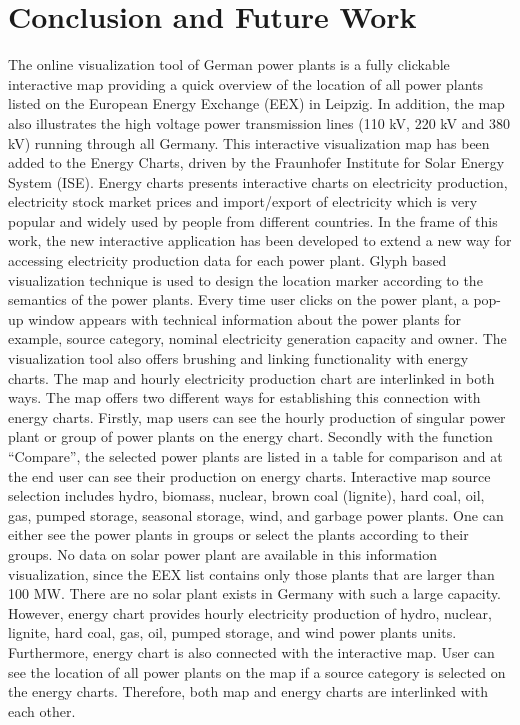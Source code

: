 \chapter{Conclusion and Future Work}
\label{chap:conclusion}

The online visualization tool of German power plants is a fully clickable interactive map providing a quick overview of the location of all power plants listed on the European Energy Exchange (EEX) in Leipzig. In addition, the map also illustrates the high voltage power transmission lines (110 kV, 220 kV and 380 kV) running through all Germany. This interactive visualization map has been added to the Energy Charts, driven by the Fraunhofer Institute for Solar Energy System (ISE). Energy charts presents interactive charts on electricity production, electricity stock market prices and import/export of electricity which is very popular and widely used by people from different countries. In the frame of this work, the new interactive application has been developed to extend a new way for accessing electricity production data for each power plant. Glyph based visualization technique is used to design the location marker according to the semantics of the power plants. Every time user clicks on the power plant, a pop-up window appears with technical information about the power plants for example, source category, nominal electricity generation capacity and owner. The visualization tool also offers brushing and linking functionality with energy charts. The map and hourly electricity production chart are interlinked in both ways. The map offers two different ways for establishing this connection with energy charts. Firstly, map users can see the hourly production of singular power plant or group of power plants on the energy chart. Secondly with the function “Compare”, the selected power plants are listed in a table for comparison and at the end user can see their production on energy charts. Interactive map source selection includes hydro, biomass, nuclear, brown coal (lignite), hard coal, oil, gas, pumped storage, seasonal storage, wind, and garbage power plants. One can either see the power plants in groups or select the plants according to their groups. No data on solar power plant are available in this information visualization, since the EEX list contains only those plants that are larger than 100 MW. There are no solar plant exists in Germany with such a large capacity.  However, energy chart provides hourly electricity production of hydro, nuclear, lignite, hard coal, gas, oil, pumped storage, and wind power plants units. Furthermore, energy chart is also connected with the interactive map. User can see the location of all power plants on the map if a source category is selected on the energy charts. Therefore, both map and energy charts are interlinked with each other. 


